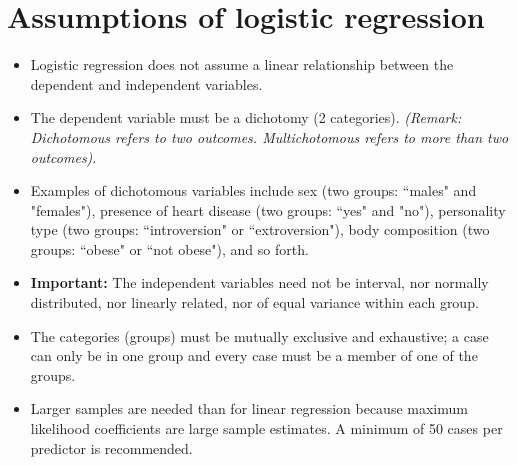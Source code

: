 \documentclass[a4paper,12pt]{article}
\begin{document}
\section*{Assumptions of logistic regression}

\begin{itemize}
	\item Logistic regression does not assume a linear relationship between the dependent and
	independent variables.
	\item The dependent variable must be a dichotomy (2 categories).
	\textit{(Remark: Dichotomous refers to two outcomes. Multichotomous refers to more than two outcomes)}.
	\item  Examples of dichotomous variables include sex (two groups: ``males" and "females"), presence of heart disease (two groups: ``yes" and "no"), personality type (two groups: ``introversion" or ``extroversion"), body composition (two groups: ``obese" or ``not obese"), and so forth. 
	\item \textbf{Important:} The independent variables need not be interval, nor normally distributed, nor linearly
	related, nor of equal variance within each group.
	\item The categories (groups) must be mutually exclusive and exhaustive; a case can only be
	in one group and every case must be a member of one of the groups.
	\item Larger samples are needed than for linear regression because maximum likelihood
	coefficients are large sample estimates. A minimum of 50 cases per predictor is
	recommended.
\end{itemize}	
\end{document}
